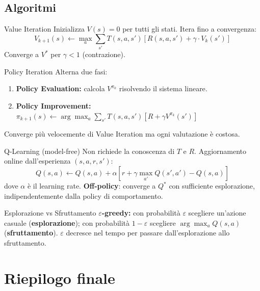 \documentclass[12pt,a4paper]{article}
\begin{document}
\subsection{Algoritmi}

\begin{thmbox}{Value Iteration}
Inizializza $V(s) = 0$ per tutti gli stati. Itera fino a convergenza:
\[
V_{k+1}(s) \leftarrow \max_{a} \sum_{s'} T(s,a,s') \left[ R(s,a,s') + \gamma \cdot V_k(s') \right]
\]
Converge a $V^*$ per $\gamma < 1$ (contrazione).
\end{thmbox}

\begin{thmbox}{Policy Iteration}
Alterna due fasi:
\begin{enumerate}[noitemsep]
  \item \textbf{Policy Evaluation:} calcola $V^{\pi_k}$ risolvendo il sistema lineare.
  \item \textbf{Policy Improvement:} $\pi_{k+1}(s) \leftarrow \arg\max_a \sum_{s'} T(s,a,s')[R + \gamma V^{\pi_k}(s')]$
\end{enumerate}
Converge più velocemente di Value Iteration ma ogni valutazione è costosa.
\end{thmbox}

\begin{thmbox}{Q-Learning (model-free)}
Non richiede la conoscenza di $T$ e $R$. Aggiornamento online dall'esperienza $(s, a, r, s')$:
\[
Q(s,a) \leftarrow Q(s,a) + \alpha \left[ r + \gamma \max_{a'} Q(s',a') - Q(s,a) \right]
\]
dove $\alpha$ è il learning rate. \textbf{Off-policy}: converge a $Q^*$ con sufficiente esplorazione, indipendentemente dalla policy di comportamento.
\end{thmbox}

\begin{defbox}{Esplorazione vs Sfruttamento}
\textbf{$\varepsilon$-greedy:} con probabilità $\varepsilon$ scegliere un'azione casuale (\textbf{esplorazione}); con probabilità $1-\varepsilon$ scegliere $\arg\max_a Q(s,a)$ (\textbf{sfruttamento}). $\varepsilon$ decresce nel tempo per passare dall'esplorazione allo sfruttamento.
\end{defbox}

\section{Riepilogo finale}
\end{document}
